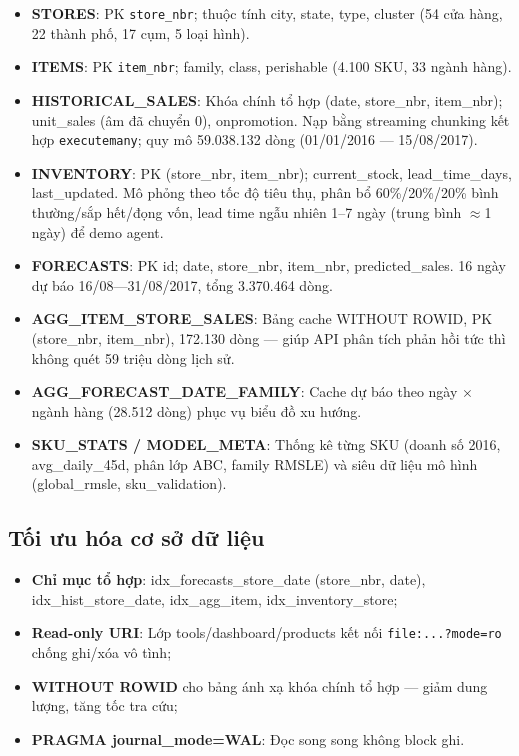 \documentclass[12pt,a4paper]{report}
\begin{document}
\begin{itemize}
    \item \textbf{STORES}: PK \texttt{store\_nbr}; thuộc tính city, state, type, cluster (54 cửa hàng, 22 thành phố, 17 cụm, 5 loại hình).
    
    \item \textbf{ITEMS}: PK \texttt{item\_nbr}; family, class, perishable (4.100 SKU, 33 ngành hàng).
    
    \item \textbf{HISTORICAL\_SALES}: Khóa chính tổ hợp (date, store\_nbr, item\_nbr); unit\_sales (âm đã chuyển 0), onpromotion. Nạp bằng streaming chunking kết hợp \texttt{executemany}; quy mô 59.038.132 dòng (01/01/2016 --- 15/08/2017).
    
    \item \textbf{INVENTORY}: PK (store\_nbr, item\_nbr); current\_stock, lead\_time\_days, last\_updated. Mô phỏng theo tốc độ tiêu thụ, phân bổ 60\%/20\%/20\% bình thường/sắp hết/đọng vốn, lead time ngẫu nhiên 1--7 ngày (trung bình $\approx$1 ngày) để demo agent.
    
    \item \textbf{FORECASTS}: PK id; date, store\_nbr, item\_nbr, predicted\_sales. 16 ngày dự báo 16/08---31/08/2017, tổng 3.370.464 dòng.
    
    \item \textbf{AGG\_ITEM\_STORE\_SALES}: Bảng cache WITHOUT ROWID, PK (store\_nbr, item\_nbr), 172.130 dòng --- giúp API phân tích phản hồi tức thì không quét 59 triệu dòng lịch sử.
    
    \item \textbf{AGG\_FORECAST\_DATE\_FAMILY}: Cache dự báo theo ngày $\times$ ngành hàng (28.512 dòng) phục vụ biểu đồ xu hướng.
    
    \item \textbf{SKU\_STATS / MODEL\_META}: Thống kê từng SKU (doanh số 2016, avg\_daily\_45d, phân lớp ABC, family RMSLE) và siêu dữ liệu mô hình (global\_rmsle, sku\_validation).
\end{itemize}

\subsection{Tối ưu hóa cơ sở dữ liệu}

\begin{itemize}
    \item \textbf{Chỉ mục tổ hợp}: idx\_forecasts\_store\_date (store\_nbr, date), idx\_hist\_store\_date, idx\_agg\_item, idx\_inventory\_store;
    \item \textbf{Read-only URI}: Lớp tools/dashboard/products kết nối \texttt{file:...?mode=ro} chống ghi/xóa vô tình;
    \item \textbf{WITHOUT ROWID} cho bảng ánh xạ khóa chính tổ hợp --- giảm dung lượng, tăng tốc tra cứu;
    \item \textbf{PRAGMA journal\_mode=WAL}: Đọc song song không block ghi.
\end{itemize}
\end{document}
